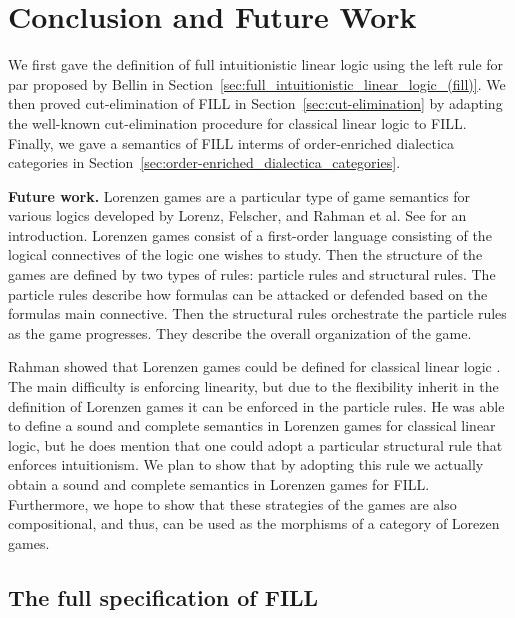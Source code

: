\section{Conclusion and Future Work}
\label{sec:conclusion_and_future_work}

We first gave the definition of full intuitionistic linear logic using
the left rule for par proposed by Bellin in
Section~\ref{sec:full_intuitionistic_linear_logic_(fill)}.  We then
proved cut-elimination of FILL in Section~\ref{sec:cut-elimination} by
adapting the well-known cut-elimination procedure for classical linear
logic to FILL.  Finally, we gave a semantics of FILL interms of
order-enriched dialectica categories in
Section~\ref{sec:order-enriched_dialectica_categories}.

\textbf{Future work.} Lorenzen games are a particular type of game
semantics for various logics developed by Lorenz, Felscher, and Rahman
et al. See \cite{Keiff:2011,Rahman:2005} for an introduction.
Lorenzen games consist of a first-order language consisting of the
logical connectives of the logic one wishes to study.  Then the
structure of the games are defined by two types of rules: particle
rules and structural rules.  The particle rules describe how formulas
can be attacked or defended based on the formulas main connective.
Then the structural rules orchestrate the particle rules as the game
progresses.  They describe the overall organization of the game.

Rahman showed that Lorenzen games could be defined for classical
linear logic \cite{Rahman:2002}.  The main difficulty is enforcing
linearity, but due to the flexibility inherit in the definition of
Lorenzen games it can be enforced in the particle rules.  He was able
to define a sound and complete semantics in Lorenzen games for
classical linear logic, but he does mention that one could adopt a
particular structural rule that enforces intuitionism.  We plan to
show that by adopting this rule we actually obtain a sound and
complete semantics in Lorenzen games for FILL.  Furthermore, we hope
to show that these strategies of the games are also compositional, and
thus, can be used as the morphisms of a category of Lorezen games.





\appendix

\begin{report}
  \section{The full specification of FILL}
\label{sec:fill_specification}
\FILLall{}
\end{report}


